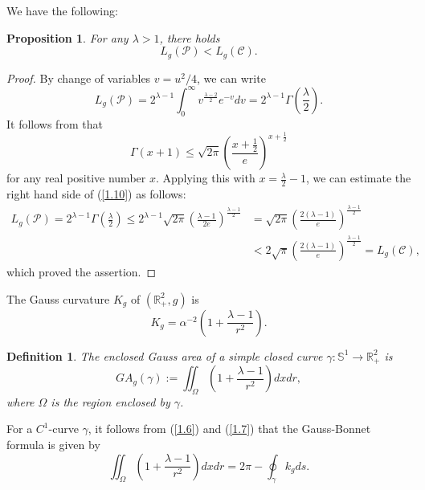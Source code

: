 \documentclass{amsart}
\theoremstyle{Corollary}
\newtheorem{prop}[theorem]{Proposition}
\newtheorem{defn}[theorem]{Definition}
\numberwithin{equation}{section}
\begin{document}
We have the following: 
\begin{prop}
For any $\lambda>1$, there holds
$$L_g(\mathcal{P})<L_g(\mathcal{C}).$$
\end{prop}
\begin{proof}
By change of variables $v=u^2/4$, we can write
\begin{equation}\label{1.10}
L_g(\mathcal{P})=2^{\lambda-1}\int_0^\infty v^{\frac{\lambda-2}{2}} e^{-v}dv=2^{\lambda-1}\Gamma\left(\frac{\lambda}{2}\right).
\end{equation}
It follows from \cite[Theorem 1.5]{Batir} that
$$\Gamma(x+1)\leq\sqrt{2\pi}\left(\frac{x+\frac{1}{2}}{e}\right)^{x+\frac{1}{2}}$$
for any real positive number $x$.
Applying this with $x=\frac{\lambda}{2}-1$, we can estimate the right hand side of (\ref{1.10}) as follows:
\begin{equation*}
\begin{split}
L_g(\mathcal{P})=2^{\lambda-1}\Gamma\left(\frac{\lambda}{2}\right)
\leq 2^{\lambda-1}\sqrt{2\pi}\left(\frac{\lambda-1}{2e}\right)^{\frac{\lambda-1}{2}}
&=\sqrt{2\pi}\left(\frac{2(\lambda-1)}{e}\right)^{\frac{\lambda-1}{2}}\\
&<
2\sqrt{\pi}\left(\frac{2(\lambda-1)}{e}\right)^{\frac{\lambda-1}{2}}=L_g(\mathcal{C}),
\end{split}
\end{equation*}
which proved the assertion.
\end{proof}




The Gauss curvature $K_g$ of $(\mathbb{R}^2_+,g)$ is
\begin{equation}\label{1.6}
K_g=\alpha^{-2}\left(1+\frac{\lambda-1}{r^2}\right).
\end{equation}

\begin{defn}
\emph{The enclosed Gauss area of a simple closed curve $\gamma:\mathbb{S}^1\to\mathbb{R}^2_+$ is
\begin{equation}\label{1.7}
GA_g(\gamma):=\iint_{\Omega}\left(1+\frac{\lambda-1}{r^2}\right)dxdr,
\end{equation}
where $\Omega$ is the region enclosed by $\gamma$.}
\end{defn}

For a $C^1$-curve $\gamma$, it follows from (\ref{1.6}) and (\ref{1.7}) that
the Gauss-Bonnet formula is given by
\begin{equation}\label{1.8}
\iint_{\Omega}\left(1+\frac{\lambda-1}{r^2}\right)dxdr=2\pi-\oint_\gamma k_gds.
\end{equation}
\end{document}
